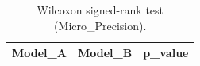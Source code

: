 \begin{table}[t]
\centering
\begin{tabular}{lll}
\toprule
Model_A & Model_B & p_value \\
\midrule
\bottomrule
\end{tabular}
\caption{Wilcoxon signed-rank test (Micro_Precision).}
\label{tab:wilcoxon_Micro_Precision}
\end{table}